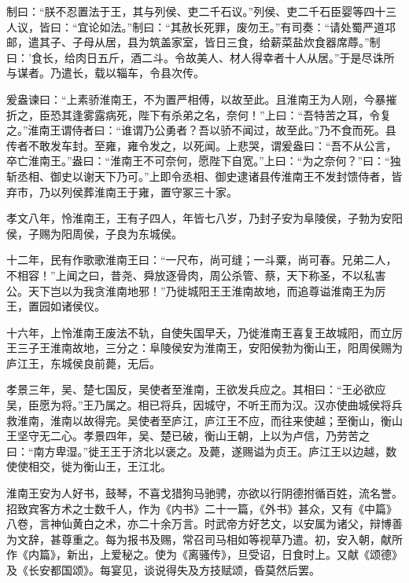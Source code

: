 \documentclass[12pt,UTF8]{ctexbook}
\begin{document}
制曰：“朕不忍置法于王，其与列侯、吏二千石议。”列侯、吏二千石臣婴等四十三人议，皆曰：“宜论如法。”制曰：“其赦长死罪，废勿王。”有司奏：“请处蜀严道邛邮，遣其子、子母从居，县为筑盖家室，皆日三食，给薪菜盐炊食器席蓐。”制曰：’食长，给肉日五斤，酒二斗。令故美人、材人得幸者十人从居。”于是尽诛所与谋者。乃遣长，载以辎车，令县次传。



爰盎谏曰：“上素骄淮南王，不为置严相傅，以故至此。且淮南王为人刚，今暴摧折之，臣恐其逢雾露病死，陛下有杀弟之名，奈何！”上曰：“吾特苦之耳，令复之。”淮南王谓侍者曰：“谁谓乃公勇者？吾以骄不闻过，故至此。”乃不食而死。县传者不敢发车封。至雍，雍令发之，以死闻。上悲哭，谓爰盎曰：“吾不从公言，卒亡淮南王。”盎曰：“淮南王不可奈何，愿陛下自宽。”上曰：“为之奈何？”曰：“独斩丞相、御史以谢天下乃可。”上即令丞相、御史逮诸县传淮南王不发封馈侍者，皆弃市，乃以列侯葬淮南王于雍，置守冢三十家。



孝文八年，怜淮南王，王有子四人，年皆七八岁，乃封子安为阜陵侯，子勃为安阳侯，子赐为阳周侯，子良为东城侯。



十二年，民有作歌歌淮南王曰：“一尺布，尚可缝；一斗粟，尚可春。兄弟二人，不相容！”上闻之曰，昔尧、舜放逐骨肉，周公杀管、蔡，天下称圣，不以私害公。天下岂以为我贪淮南地邪！”乃徙城阳王王淮南故地，而追尊谥淮南王为厉王，置园如诸侯仪。



十六年，上怜淮南王废法不轨，自使失国早夭，乃徙淮南王喜复王故城阳，而立厉王三子王淮南故地，三分之：阜陵侯安为淮南王，安阳侯勃为衡山王，阳周侯赐为庐江王，东城侯良前薨，无后。



孝景三年，吴、楚七国反，吴使者至淮南，王欲发兵应之。其相曰：“王必欲应吴，臣愿为将。”王乃属之。相已将兵，因城守，不听王而为汉。汉亦使曲城侯将兵救淮南，淮南以故得完。吴使者至庐江，庐江王不应，而往来使越；至衡山，衡山王坚守无二心。孝景四年，吴、楚已破，衡山王朝，上以为卢信，乃劳苦之曰：“南方卑湿。”徙王王于济北以褒之。及薨，遂赐谥为贞王。庐江王以边越，数使使相交，徙为衡山王，王江北。



淮南王安为人好书，鼓琴，不喜戈猎狗马驰骋，亦欲以行阴德拊循百姓，流名誉。招致宾客方术之士数千人，作为《内书》二十一篇，《外书》甚众，又有《中篇》八卷，言神仙黄白之术，亦二十余万言。时武帝方好艺文，以安属为诸父，辩博善为文辞，甚尊重之。每为报书及赐，常召司马相如等视草乃遣。初，安入朝，献所作《内篇》，新出，上爱秘之。使为《离骚传》，旦受诏，日食时上。又献《颂德》及《长安都国颂》。每宴见，谈说得失及方技赋颂，昏莫然后罢。
\end{document}
